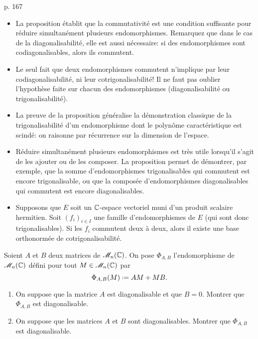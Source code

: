 \begin{remarque}
    \cite{objectif_agregation} p. 167 
    \begin{itemize}
        \item La proposition établit que la commutativité est une condition suffisante pour réduire simultanément plusieurs endomorphismes. Remarquez que dans le cas de la diagonalisabilité, elle est aussi nécessaire: si des endomorphismes sont codiagonalisables, alors ils commutent. 
        \item Le seul fait que deux endomorphismes commutent n'implique par leur codiagonalisabilité, ni leur cotrigonalisabilité! Il ne faut pas oublier l'hypothèse faite sur chacun des endomorphismes (diagonalisabilité ou trigonalisabilité).
        \item La preuve de la proposition généralise la démonstration classique de la trigonalisabilité d'un endomorphisme dont le polynôme caractéristique est scindé: on raisonne par récurrence sur la dimension de l'espace. 
        \item Réduire simultanément plusieurs endomorphismes est très utile lorsqu'il s'agit de les ajouter ou de les composer. La proposition permet de démontrer, par exemple, que la somme d'endomorphismes trigonalisables qui commutent est encore trigonalisable, ou que la composée d'endomorphismes diagonalisables qui commutent est encore diagonalisables. 
        \item Supposons que $E$ soit un $\mathbb{C}$-espace vectoriel muni d'un produit scalaire hermitien. Soit $(f_i)_{i \in I}$ une famille d'endomorphismes de $E$ (qui sont donc trigonalisables). Si les $f_i$ commutent deux à deux, alors il existe une base orthonormée de cotrigonalisabilité. 
    \end{itemize}
\end{remarque}


\begin{exercice}
    Soient $A$ et $B$ deux matrices de $\mathscr{M}_n(\mathbb{C})$. On pose $\Phi_{A,B}$ l'endomorphisme de $\mathscr{M}_n(\mathbb{C})$ défini pour tout $M \in \mathscr{M}_n(\mathbb{C})$ par
    $$\Phi_{A,B}(M) \defeq AM + MB.$$
    \begin{enumerate}
         \item On suppose que la matrice $A$ est diagonalisable et que $B = 0$. Montrer que $\Phi_{A, B}$ est diagonalisable.
        \item On suppose que les matrices $A$ et $B$ sont diagonalisables. Montrer que $\Phi_{A, B}$ est diagonalisable. 
    \end{enumerate}
\end{exercice}


